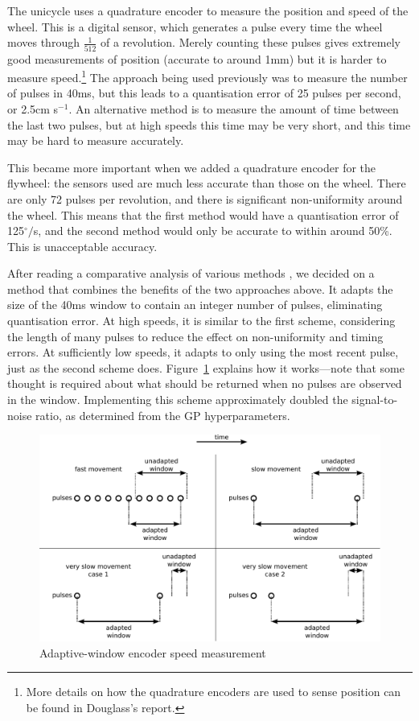 \documentclass{IIBproject}
\begin{document}
The unicycle uses a quadrature encoder to measure the position and speed of
the wheel. This is a digital sensor, which generates a pulse every time the
wheel moves through $\frac{1}{512}$ of a revolution.  Merely counting these
pulses gives extremely good measurements of position (accurate to around 1mm)
but it is harder to measure speed.\footnote{More details on how the quadrature
encoders are used to sense position can be found in Douglass's report.
\nocite{ref:douglass}} The approach being used previously was to measure the
number of pulses in 40ms, but this leads to a quantisation error of 25 pulses
per second, or 2.5cm s$^{-1}$.  An alternative method is to measure the amount
of time between the last two pulses, but at high speeds this time may be very
short, and this time may be hard to measure accurately.

This became more important when we added a quadrature encoder for the
flywheel: the sensors used are much less accurate than those on the wheel.
There are only 72 pulses per revolution, and there is significant
non-uniformity around the wheel. This means that the first method would have a
quantisation error of 125$^\circ/$s, and the second method would only be
accurate to within around 50\%. This is unacceptable accuracy.

After reading a comparative analysis of various methods \cite{ref:encspeed},
we decided on a method that combines the benefits of the two approaches above.
It adapts the size of the 40ms window to contain an integer number of pulses,
eliminating quantisation error. At high speeds, it is similar to the first
scheme, considering the length of many pulses to reduce the effect on
non-uniformity and timing errors. At sufficiently low speeds, it adapts to
only using the most recent pulse, just as the second scheme does.
Figure~\ref{fig:encoder_speed} explains how it works---note that some thought
is required about what should be returned when no pulses are observed in the
window. Implementing this scheme approximately doubled the signal-to-noise
ratio, as determined from the GP hyperparameters.

\begin{figure}[htpb]
  \begin{center}
    \includegraphics[width=15cm]{encoder_speed.pdf}
    \end{center}
    \caption{Adaptive-window encoder speed measurement}
    \label{fig:encoder_speed}
    \end{figure}
\end{document}

